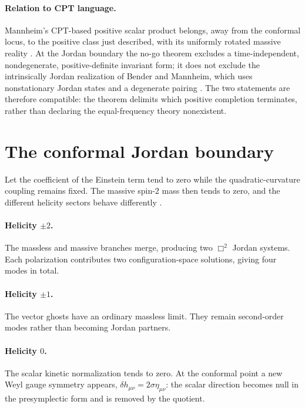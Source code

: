\documentclass[11pt]{article}
\theoremstyle{remark}
\begin{document}
\paragraph{Relation to CPT language.}
Mannheim's CPT-based positive scalar product belongs, away from the
conformal locus, to the positive class just described, with its uniformly
rotated massive reality \cite{Mannheim2016}.  At the Jordan boundary the
no-go theorem excludes a time-independent, nondegenerate,
positive-definite invariant form; it does not exclude the intrinsically
Jordan realization of Bender and Mannheim, which uses nonstationary
Jordan states and a degenerate pairing \cite{BM2008PRD}.  The two
statements are therefore compatible: the theorem delimits which positive
completion terminates, rather than declaring the equal-frequency theory
nonexistent.

\section{The conformal Jordan boundary}\label{sec:conformal}

Let the coefficient of the Einstein term tend to zero while the
quadratic-curvature coupling remains fixed.  The massive spin-$2$ mass
then tends to zero, and the different helicity sectors behave
differently \cite{paperIV}.

\paragraph{Helicity $\pm2$.}
The massless and massive branches merge, producing two $\Box^2$ Jordan
systems.  Each polarization contributes two configuration-space
solutions, giving four modes in total.

\paragraph{Helicity $\pm1$.}
The vector ghosts have an ordinary massless limit.  They remain
second-order modes rather than becoming Jordan partners.

\paragraph{Helicity $0$.}
The scalar kinetic normalization tends to zero.  At the conformal point a
new Weyl gauge symmetry appears,
$\delta h_{\mu\nu}=2\sigma\eta_{\mu\nu}$: the scalar direction becomes
null in the presymplectic form and is removed by the quotient.
\end{document}
